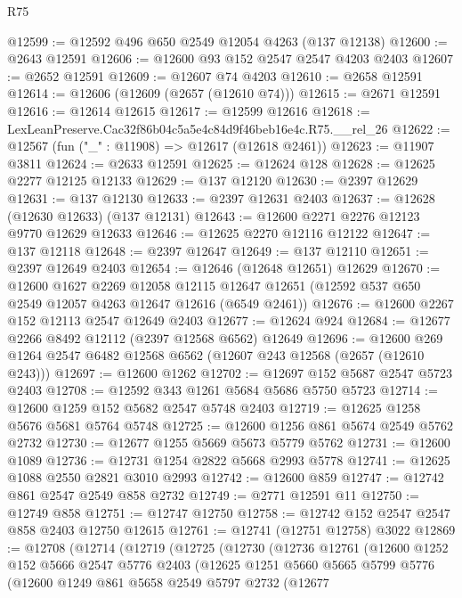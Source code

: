 \begin{lexlean}{R75}
\begin{coremodule}
@12599 := @12592 @496 @650 @2549 @12054 @4263 (@137 @12138)
@12600 := @2643 @12591
@12606 := @12600 @93 @152 @2547 @2547 @4203 @2403
@12607 := @2652 @12591
@12609 := @12607 @74 @4203
@12610 := @2658 @12591
@12614 := @12606 (@12609 (@2657 (@12610 @74)))
@12615 := @2671 @12591
@12616 := @12614 @12615
@12617 := @12599 @12616
@12618 := LexLeanPreserve.Cac32f86b04c5a5e4c84d9f46beb16e4c.R75.__rel_26
@12622 := @12567 (fun ("_" : @11908) => @12617 (@12618 @2461))
@12623 := @11907 @3811
@12624 := @2633 @12591
@12625 := @12624 @128
@12628 := @12625 @2277 @12125 @12133
@12629 := @137 @12120
@12630 := @2397 @12629
@12631 := @137 @12130
@12633 := @2397 @12631 @2403
@12637 := @12628 (@12630 @12633) (@137 @12131)
@12643 := @12600 @2271 @2276 @12123 @9770 @12629 @12633
@12646 := @12625 @2270 @12116 @12122
@12647 := @137 @12118
@12648 := @2397 @12647
@12649 := @137 @12110
@12651 := @2397 @12649 @2403
@12654 := @12646 (@12648 @12651) @12629
@12670 := @12600
    @1627
    @2269
    @12058
    @12115
    @12647
    @12651
    (@12592 @537 @650 @2549 @12057 @4263 @12647 @12616 (@6549 @2461))
@12676 := @12600 @2267 @152 @12113 @2547 @12649 @2403
@12677 := @12624 @924
@12684 := @12677 @2266 @8492 @12112 (@2397 @12568 @6562) @12649
@12696 := @12600 @269 @1264 @2547 @6482 @12568 @6562 (@12607 @243 @12568 (@2657 (@12610 @243)))
@12697 := @12600 @1262
@12702 := @12697 @152 @5687 @2547 @5723 @2403
@12708 := @12592 @343 @1261 @5684 @5686 @5750 @5723
@12714 := @12600 @1259 @152 @5682 @2547 @5748 @2403
@12719 := @12625 @1258 @5676 @5681 @5764 @5748
@12725 := @12600 @1256 @861 @5674 @2549 @5762 @2732
@12730 := @12677 @1255 @5669 @5673 @5779 @5762
@12731 := @12600 @1089
@12736 := @12731 @1254 @2822 @5668 @2993 @5778
@12741 := @12625 @1088 @2550 @2821 @3010 @2993
@12742 := @12600 @859
@12747 := @12742 @861 @2547 @2549 @858 @2732
@12749 := @2771 @12591 @11
@12750 := @12749 @858
@12751 := @12747 @12750
@12758 := @12742 @152 @2547 @2547 @858 @2403 @12750 @12615
@12761 := @12741 (@12751 @12758) @3022
@12869 := @12708
    (@12714
      (@12719
        (@12725
          (@12730
            (@12736
              @12761
              (@12600
                @1252
                @152
                @5666
                @2547
                @5776
                @2403
                (@12625
                  @1251
                  @5660
                  @5665
                  @5799
                  @5776
                  (@12600
                    @1249
                    @861
                    @5658
                    @2549
                    @5797
                    @2732
                    (@12677

\end{coremodule}
\end{lexlean}
